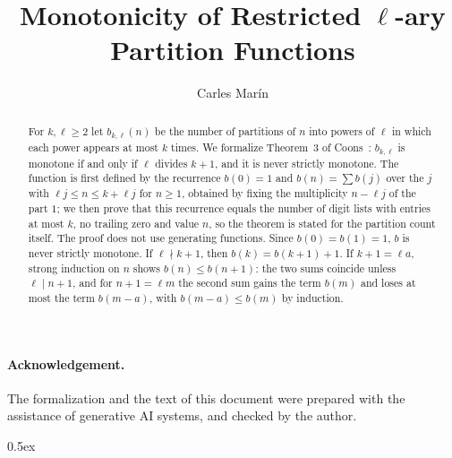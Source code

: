 \documentclass[10pt,a4paper]{article}
\begin{document}
\title{Monotonicity of Restricted $\ell$-ary Partition Functions}
\author{Carles Mar\'in}
\maketitle

\begin{abstract}
For $k,\ell\ge 2$ let $b_{k,\ell}(n)$ be the number of partitions of $n$ into powers of $\ell$ in which each power
appears at most $k$ times. We formalize Theorem~3 of Coons~\cite{Coons2026}: $b_{k,\ell}$ is monotone if and only if
$\ell$ divides $k+1$, and it is never strictly monotone. The function is first defined by the recurrence
$b(0)=1$ and $b(n)=\sum b(j)$ over the $j$ with $\ell j\le n\le k+\ell j$ for $n\ge1$, obtained by fixing the
multiplicity $n-\ell j$ of the part $1$; we then prove that this recurrence equals the number of digit lists with entries
at most $k$, no trailing zero and value $n$, so the theorem is stated for the partition count itself. The proof does not
use generating functions. Since $b(0)=b(1)=1$, $b$ is never strictly monotone. If $\ell\nmid k+1$, then
$b(k)=b(k+1)+1$. If $k+1=\ell a$, strong induction on $n$ shows $b(n)\le b(n+1)$: the two sums coincide unless
$\ell\mid n+1$, and for $n+1=\ell m$ the second sum gains the term $b(m)$ and loses at most the term $b(m-a)$, with $b(m-a)\le b(m)$ by
induction.
\end{abstract}

\paragraph{Acknowledgement.} The formalization and the text of this document were prepared with the
assistance of generative AI systems, and checked by the author.

\tableofcontents

\parindent 0pt\parskip 0.5ex





\end{document}
